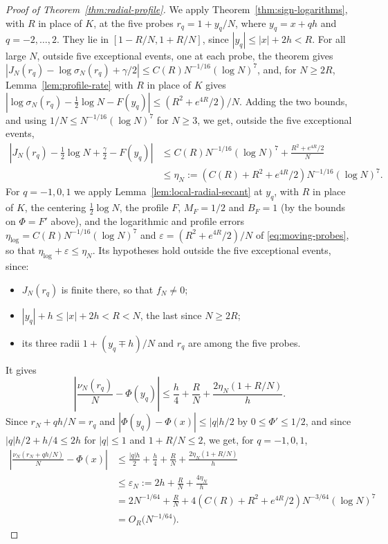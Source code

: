 \begin{proof}[Proof of Theorem~\ref{thm:radial-profile}]
We apply Theorem~\ref{thm:sign-logarithms}, with $R$ in place of $K$, at
the five probes $r_q=1+y_q/N$, where $y_q=x+qh$ and $q=-2,\dots,2$.
They lie in $[1-R/N,1+R/N]$, since $|y_q|\le|x|+2h<R$. For all large
$N$, outside five exceptional events, one at each probe, the theorem
gives
$|J_N(r_q)-\log\sigma_N(r_q)+\gamma/2|\le C(R)N^{-1/16}(\log N)^7$, and,
for $N\ge2R$, Lemma~\ref{lem:profile-rate} with $R$ in place of $K$ gives
$|\log\sigma_N(r_q)-\frac12\log N-F(y_q)|\le(R^2+e^{4R}/2)/N$. Adding the
two bounds, and using $1/N\le N^{-1/16}(\log N)^7$ for $N\ge3$, we get,
outside the five exceptional events,
\begin{align}
 \left|J_N(r_q)-\frac12\log N+\frac\gamma2-F(y_q)\right|
 &\le C(R)N^{-1/16}(\log N)^7+\frac{R^2+e^{4R}/2}N\nonumber\\
 &\le\eta_N:=(C(R)+R^2+e^{4R}/2)N^{-1/16}(\log N)^7.
 \label{eq:moving-probes}
\end{align}
For $q=-1,0,1$ we apply Lemma~\ref{lem:local-radial-secant} at $y_q$,
with $R$ in place of $K$, the centering $\frac12\log N$, the profile $F$,
$M_F=1/2$ and $B_F=1$ (by the bounds on $\Phi=F'$ above), and the
logarithmic and profile errors $\eta_{\log}=C(R)N^{-1/16}(\log N)^7$ and
$\varepsilon=(R^2+e^{4R}/2)/N$ of \eqref{eq:moving-probes}, so that
$\eta_{\log}+\varepsilon\le\eta_N$. Its hypotheses hold outside the five
exceptional events, since:
\begin{itemize}
\item $J_N(r_q)$ is finite there, so that $f_N\ne0$;
\item $|y_q|+h\le|x|+2h<R<N$, the last since $N\ge2R$;
\item its three radii $1+(y_q\mp h)/N$ and $r_q$ are among the five
probes.
\end{itemize}
It gives
\[
 \left|\frac{\nu_N(r_q)}N-\Phi(y_q)\right|
 \le\frac h4+\frac RN+\frac{2\eta_N(1+R/N)}h.
\]
Since $r_N+qh/N=r_q$ and $|\Phi(y_q)-\Phi(x)|\le|q|h/2$ by
$0\le\Phi'\le1/2$, and since $|q|h/2+h/4\le2h$ for $|q|\le1$ and
$1+R/N\le2$, we get, for $q=-1,0,1$,
\begin{align}
 \left|\frac{\nu_N(r_N+qh/N)}N-\Phi(x)\right|
 &\le\frac{|q|h}{2}+\frac h4+\frac RN
       +\frac{2\eta_N(1+R/N)}h\nonumber\\
 &\le\varepsilon_N:=2h+\frac RN+\frac{4\eta_N}h\nonumber\\
 &=2N^{-1/64}+\frac RN+4(C(R)+R^2+e^{4R}/2)N^{-3/64}(\log N)^7\nonumber\\
 &=O_R\bigl(N^{-1/64}\bigr).
 \label{eq:moving-secant}
\end{align}

\end{proof}
